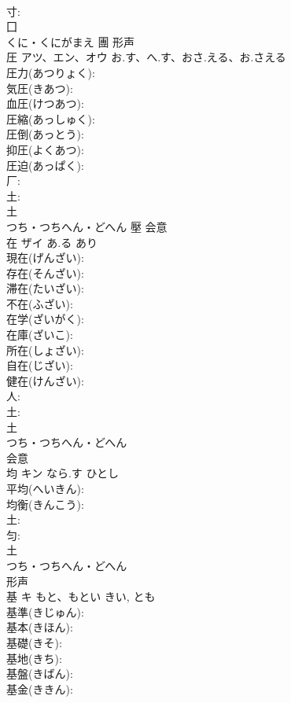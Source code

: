 \documentclass[8pt]{extreport}
\begin{document}
\begin{CJK}{UTF8}{min}
\\	寸: 
\\	囗	
\\	くに・くにがまえ	團	形声 
\\	圧	アツ、エン、オウ	お.す、へ.す、おさ.える、お.さえる		
\\	圧力(あつりょく): 
\\	気圧(きあつ): 
\\	血圧(けつあつ): 
\\	圧縮(あっしゅく): 
\\	圧倒(あっとう): 
\\	抑圧(よくあつ): 
\\	圧迫(あっぱく): 
\\	厂: 
\\	土: 
\\	土	
\\	つち・つちへん・どへん	壓	会意 
\\	在	ザイ	あ.る	あり	
\\	現在(げんざい): 
\\	存在(そんざい): 
\\	滞在(たいざい): 
\\	不在(ふざい): 
\\	在学(ざいがく): 
\\	在庫(ざいこ): 
\\	所在(しょざい): 
\\	自在(じざい): 
\\	健在(けんざい): 
\\	人: 
\\	土: 
\\	土	
\\	つち・つちへん・どへん	
\\	会意 
\\	均	キン	なら.す	ひとし	
\\	平均(へいきん): 
\\	均衡(きんこう): 
\\	土: 
\\	匀: 
\\	土	
\\	つち・つちへん・どへん	
\\	形声 
\\	基	キ	もと、もとい	きい, とも	
\\	基準(きじゅん): 
\\	基本(きほん): 
\\	基礎(きそ): 
\\	基地(きち): 
\\	基盤(きばん): 
\\	基金(ききん): 

\end{CJK}
\end{document}
